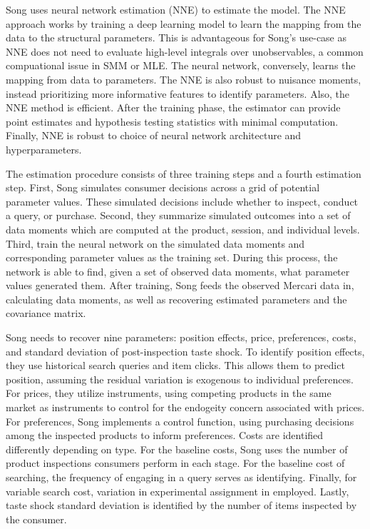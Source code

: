 \documentclass[11pt]{article}
\theoremstyle{definition}
\theoremstyle{remark}
\begin{document}
Song uses neural network estimation (NNE) to estimate the model. The NNE approach works by training a deep learning model to learn the mapping from the data to the 
structural parameters. This is advantageous for Song's use-case as NNE does not need to evaluate high-level integrals over unobservables, a common compuational issue
in SMM or MLE. The neural network, conversely, learns the mapping from data to parameters. The NNE is also robust to nuisance moments, instead prioritizing more informative
features to identify parameters. Also, the NNE method is efficient. After the training phase, the estimator can provide point estimates and hypothesis testing statistics 
with minimal computation. Finally, NNE is robust to choice of neural network architecture and hyperparameters.

The estimation procedure consists of three training steps and a fourth estimation step. First, Song simulates consumer decisions across a grid of potential parameter values.
These simulated decisions include whether to inspect, conduct a query, or purchase. Second, they summarize simulated outcomes into a set of data moments which are computed
at the product, session, and individual levels. Third, train the neural network on the simulated data moments and corresponding parameter values as the training set. During
this process, the network is able to find, given a set of observed data moments, what parameter values generated them. After training, Song feeds the observed Mercari data in,
calculating data moments, as well as recovering estimated parameters and the covariance matrix.

Song needs to recover nine parameters: position effects, price, preferences, costs, and standard deviation of post-inspection taste shock. To identify position effects, they use 
historical search queries and item clicks. This allows them to predict position, assuming the residual variation is exogenous to individual preferences. For prices, they utilize
\cite{gandhi_measuring_2019} instruments, using competing products in the same market as instruments to control for the endogeity concern associated with prices. For preferences, Song
implements a control function, using purchasing decisions among the inspected products to inform preferences. Costs are identified differently depending on type. For the baseline costs,
Song uses the number of product inspections consumers perform in each stage. For the baseline cost of searching, the frequency of engaging in a query serves as identifying.
Finally, for variable search cost, variation in experimental assignment in employed. Lastly, taste shock standard deviation is identified by the number of items inspected by the consumer.
\end{document}
